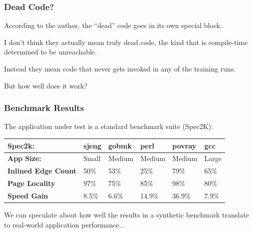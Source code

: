 \begin{frame}
\frametitle{Dead Code?}

According to the author, the ``dead'' code goes in its own special block. 

I don't think they actually mean truly dead code, the kind that is compile-time determined to be unreachable. 

Instead they mean code that never gets invoked in any of the training runs.

But how well does it work?

\end{frame}



\begin{frame}
\frametitle{Benchmark Results}

The application under test is a standard benchmark suite (Spec2K):

\begin{center}
\begin{tabular}{l|l|l|l|l|l}
	\textbf{Spec2k:} & \textbf{sjeng} & \textbf{gobmk} & \textbf{perl} & \textbf{povray} & \textbf{gcc}\\ \hline
	\textbf{App Size:} &  {Small} & {Medium} & {Medium} & {Medium} & {Large} \\ \hline
	\textbf{Inlined Edge Count} & 50\% & 53\% & 25\% & 79\% & 65\% \\ \hline
	\textbf{Page Locality} & 97\% & 75\% & 85\% & 98\% & 80\% \\ \hline
	\textbf{Speed Gain} & 8.5\% & 6.6\% & 14.9\% & 36.9\% & 7.9\% \\ 
\end{tabular}
\end{center}

We can speculate about how well the results in a synthetic benchmark translate to real-world application performance...


\end{frame}



